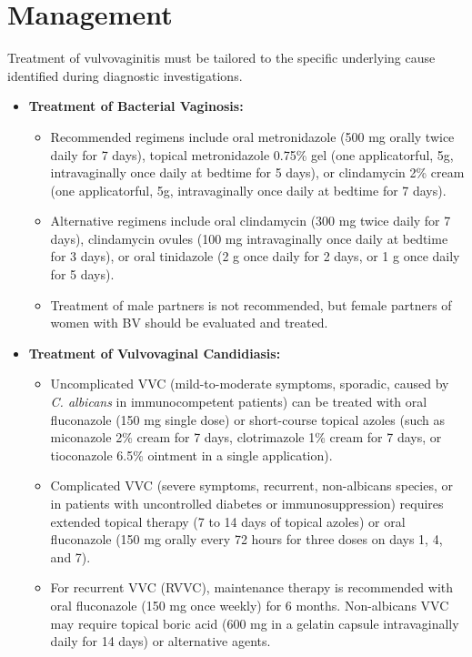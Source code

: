 \section*{Management}
Treatment of vulvovaginitis must be tailored to the specific underlying cause identified during diagnostic investigations.
\begin{itemize}
    \item \textbf{Treatment of Bacterial Vaginosis:}
    \begin{itemize}
        \item Recommended regimens include oral metronidazole (500 mg orally twice daily for 7 days), topical metronidazole 0.75\% gel (one applicatorful, 5g, intravaginally once daily at bedtime for 5 days), or clindamycin 2\% cream (one applicatorful, 5g, intravaginally once daily at bedtime for 7 days).
        \item Alternative regimens include oral clindamycin (300 mg twice daily for 7 days), clindamycin ovules (100 mg intravaginally once daily at bedtime for 3 days), or oral tinidazole (2 g once daily for 2 days, or 1 g once daily for 5 days).
        \item Treatment of male partners is not recommended, but female partners of women with BV should be evaluated and treated.
    \end{itemize}
    \item \textbf{Treatment of Vulvovaginal Candidiasis:}
    \begin{itemize}
        \item Uncomplicated VVC (mild-to-moderate symptoms, sporadic, caused by \textit{C. albicans} in immunocompetent patients) can be treated with oral fluconazole (150 mg single dose) or short-course topical azoles (such as miconazole 2\% cream for 7 days, clotrimazole 1\% cream for 7 days, or tioconazole 6.5\% ointment in a single application).
        \item Complicated VVC (severe symptoms, recurrent, non-albicans species, or in patients with uncontrolled diabetes or immunosuppression) requires extended topical therapy (7 to 14 days of topical azoles) or oral fluconazole (150 mg orally every 72 hours for three doses on days 1, 4, and 7).
        \item For recurrent VVC (RVVC), maintenance therapy is recommended with oral fluconazole (150 mg once weekly) for 6 months. Non-albicans VVC may require topical boric acid (600 mg in a gelatin capsule intravaginally daily for 14 days) or alternative agents.
    \end{itemize}

\end{itemize}
